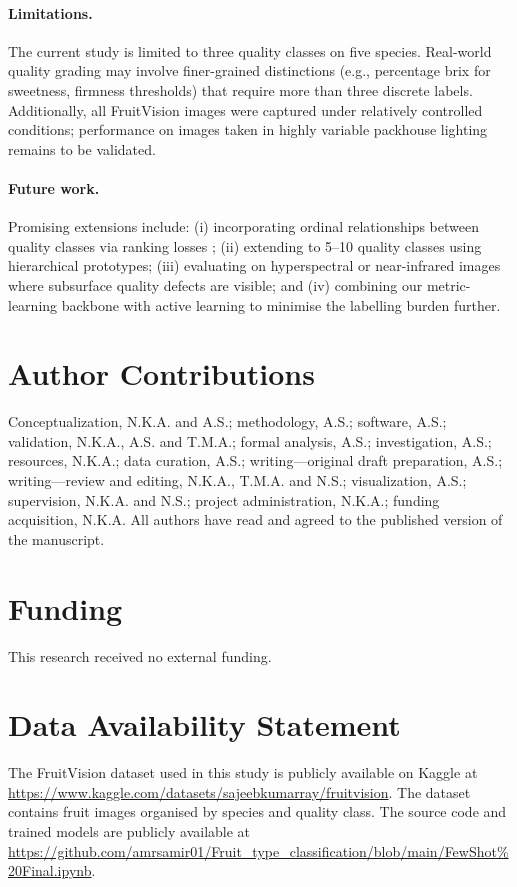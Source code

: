 \documentclass[preprint,12pt,authoryear]{elsarticle}
\begin{document}
\paragraph{Limitations.}
The current study is limited to three quality classes on five species. Real-world
quality grading may involve finer-grained distinctions (e.g., percentage brix
for sweetness, firmness thresholds) that require more than three discrete labels.
Additionally, all FruitVision images were captured under relatively controlled
conditions; performance on images taken in highly variable packhouse lighting
remains to be validated.

\paragraph{Future work.}
Promising extensions include: (i) incorporating ordinal relationships between
quality classes via ranking losses \citep{cao2007learning}; (ii) extending to
5--10 quality classes using hierarchical prototypes; (iii) evaluating on
hyperspectral or near-infrared images where subsurface quality defects are
visible; and (iv) combining our metric-learning backbone with active learning
to minimise the labelling burden further.


\section*{Author Contributions}
Conceptualization, N.K.A. and A.S.; methodology, A.S.; software, A.S.;
validation, N.K.A., A.S. and T.M.A.; formal analysis, A.S.; investigation, A.S.;
resources, N.K.A.; data curation, A.S.; writing---original draft preparation,
A.S.; writing---review and editing, N.K.A., T.M.A. and N.S.; visualization, A.S.;
supervision, N.K.A. and N.S.; project administration, N.K.A.; funding acquisition,
N.K.A. All authors have read and agreed to the published version of the manuscript.

\section*{Funding}
This research received no external funding.

\section*{Data Availability Statement}
The FruitVision dataset used in this study is publicly available on Kaggle at
\url{https://www.kaggle.com/datasets/sajeebkumarray/fruitvision}. The dataset
contains fruit images organised by species and quality class. The source code and
trained models are publicly available at
\url{https://github.com/amrsamir01/Fruit_type_classification/blob/main/FewShot\%20Final.ipynb}.
\end{document}
